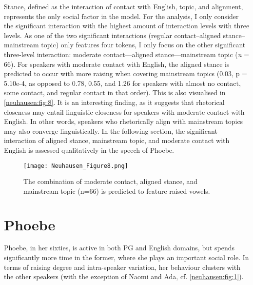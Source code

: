 \documentclass[output=paper]{langscibook}
\begin{document}
Stance, defined as the interaction of contact with English, topic, and alignment, represents the only social factor in the model. For the analysis, I only consider the significant interaction with the highest amount of interaction levels with three levels. As one of the two significant interactions (regular contact--aligned stance--mainstream topic) only features four tokens, I only focus on the other significant three-level interaction: moderate contact—aligned stance—mainstream topic (\textit{n} = 66). For speakers with moderate contact with English, the aligned stance is predicted to occur with more raising when covering mainstream topics (0.03, p = 5.10e-4, as opposed to 0.78, 0.55, and 1.26 for speakers with almost no contact, some contact, and regular contact in that order). This is also visualised in \autoref{neuhausen:fig:8}. It is an interesting finding, as it suggests that rhetorical closeness may entail linguistic closeness for speakers with moderate contact with English. In other words, speakers who rhetorically align with mainstream topics may also converge linguistically. In the following section, the significant interaction of aligned stance, mainstream topic, and moderate contact with English is assessed qualitatively in the speech of Phoebe.

\begin{figure}[t]
    \texttt{[image: Neuhausen\_Figure8.png]}
    \caption{The combination of moderate contact, aligned stance, and mainstream topic (n=66) is predicted to feature raised vowels.}
    \label{neuhausen:fig:8}
\end{figure}



\section{Phoebe}
Phoebe, in her sixties, is active in both \gls*{PG} and English domains, but spends significantly more time in the former, where she plays an important social role. In terms of raising degree and intra-speaker variation, her behaviour clusters with the other speakers (with the exception of Naomi and Ada, cf. \autoref{neuhausen:fig:1}). 
\end{document}
